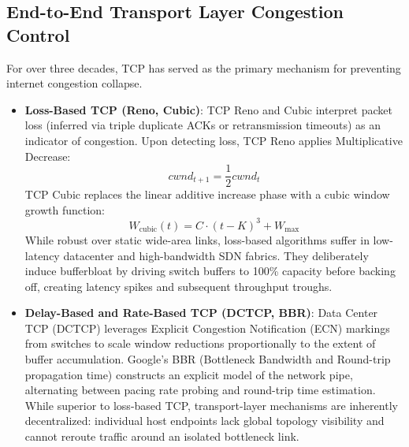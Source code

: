 \subsection{End-to-End Transport Layer Congestion Control}
For over three decades, TCP has served as the primary mechanism for preventing internet congestion collapse.
\begin{itemize}[leftmargin=1.5em]
  \item \textbf{Loss-Based TCP (Reno, Cubic)}: TCP Reno and Cubic interpret packet loss (inferred via triple duplicate ACKs or retransmission timeouts) as an indicator of congestion. Upon detecting loss, TCP Reno applies Multiplicative Decrease:
  \begin{equation}
    cwnd_{t+1} = \frac{1}{2} cwnd_t
  \end{equation}
  TCP Cubic replaces the linear additive increase phase with a cubic window growth function:
  \begin{equation}
    W_{\text{cubic}}(t) = C \cdot (t - K)^3 + W_{\text{max}}
  \end{equation}
  While robust over static wide-area links, loss-based algorithms suffer in low-latency datacenter and high-bandwidth SDN fabrics. They deliberately induce bufferbloat by driving switch buffers to 100\% capacity before backing off, creating latency spikes and subsequent throughput troughs.
  \item \textbf{Delay-Based and Rate-Based TCP (DCTCP, BBR)}: Data Center TCP (DCTCP) \cite{alizadeh2010data} leverages Explicit Congestion Notification (ECN) markings from switches to scale window reductions proportionally to the extent of buffer accumulation. Google's BBR (Bottleneck Bandwidth and Round-trip propagation time) \cite{cardwell2017bbr} constructs an explicit model of the network pipe, alternating between pacing rate probing and round-trip time estimation. While superior to loss-based TCP, transport-layer mechanisms are inherently decentralized: individual host endpoints lack global topology visibility and cannot reroute traffic around an isolated bottleneck link.
\end{itemize}

